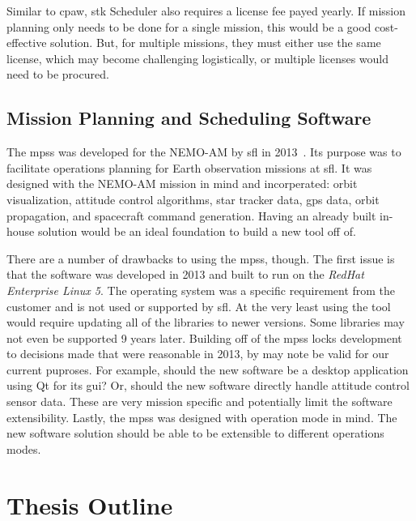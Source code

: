 Similar to \gls{cpaw}, \gls{stk} Scheduler also requires a license fee payed
yearly. If mission planning only needs to be done for a single mission, this
would be a good cost-effective solution. But, for multiple missions, they must
either use the same license, which may become challenging logistically, or
multiple licenses would need to be procured.


\subsection{Mission Planning and Scheduling Software}

The \gls{mpss} was developed for the NEMO-AM by \gls{sfl} in 2013~\cite{payam}.
Its purpose was to facilitate operations planning for Earth observation
missions at \gls{sfl}. It was designed with the NEMO-AM mission in mind and
incorperated: orbit visualization, attitude control algorithms, star tracker
data, \gls{gps} data, orbit propagation, and spacecraft command generation.
Having an already built in-house solution would be an ideal foundation to build
a new tool off of. 

There are a number of drawbacks to using the \gls{mpss}, though. The first
issue is that the software was developed in 2013 and built to run on the
\textit{RedHat Enterprise Linux 5}. The operating system was a specific
requirement from the customer and is not used or supported by \gls{sfl}. At the
very least using the tool would require updating all of the libraries to newer
versions. Some libraries may not even be supported 9 years later. Building off
of the \gls{mpss} locks development to decisions made that were reasonable in
2013, by may note be valid for our current puproses. For example, should the
new software be a desktop application using Qt for its \gls{gui}? Or, should
the new software directly handle attitude control sensor data. These are very
mission specific and potentially limit the software extensibility. Lastly, the
\gls{mpss} was designed with operation mode in mind. The new software solution
should be able to be extensible to different operations modes.    


\section{Thesis Outline} 

